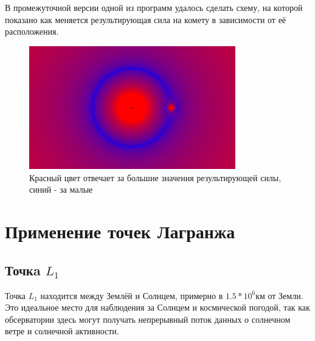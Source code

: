 \documentclass[a4paper,12pt]{article}
\begin{document}
В промежуточной версии одной из программ удалось сделать схему, на которой показано как меняется результирующая сила на комету в зависимости от её расположения.
\begin{figure}[H]
    \begin{center}
	\includegraphics[width=0.8\textwidth]{resultforce.jpg}
	\caption{Красный цвет отвечает за большие значения результирующей силы, синий - за малые}
    \end{center}
\end{figure}

\section{Применение точек Лагранжа}

\subsection{Точкa $L_1$}

Точка $L_1$ находится между Землёй и Солнцем, примерно в $1.5*10^6$км от Земли. Это идеальное место для наблюдения за Солнцем и космической погодой,
так как обсерватории здесь могут получать непрерывный поток данных о солнечном ветре и солнечной активности.
\end{document}
